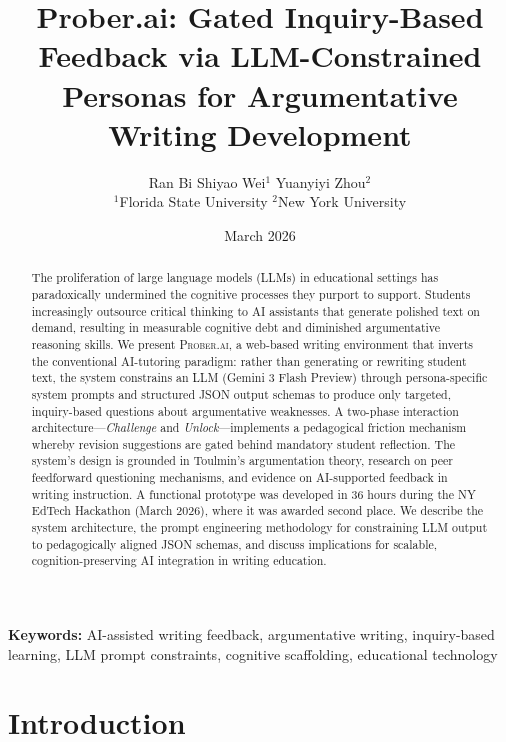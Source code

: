 \documentclass[11pt,a4paper]{article}
\title{%
\textbf{Prober.ai: Gated Inquiry-Based Feedback via LLM-Constrained Personas for Argumentative Writing Development}
}
\author{
Ran Bi \quad Shiyao Wei$^{1}$ \quad Yuanyiyi Zhou$^{2}$ \\[4pt]
\small $^{1}$Florida State University \quad $^{2}$New York University
}
\date{March 2026}
\begin{document}
\maketitle

\begin{abstract}
The proliferation of large language models (LLMs) in educational settings has paradoxically undermined the cognitive processes they purport to support. Students increasingly outsource critical thinking to AI assistants that generate polished text on demand, resulting in measurable cognitive debt and diminished argumentative reasoning skills. We present \textsc{Prober.ai}, a web-based writing environment that inverts the conventional AI-tutoring paradigm: rather than generating or rewriting student text, the system constrains an LLM (Gemini 3 Flash Preview) through persona-specific system prompts and structured JSON output schemas to produce only targeted, inquiry-based questions about argumentative weaknesses. A two-phase interaction architecture---\textit{Challenge} and \textit{Unlock}---implements a pedagogical friction mechanism whereby revision suggestions are gated behind mandatory student reflection. The system's design is grounded in Toulmin's argumentation theory, research on peer feedforward questioning mechanisms, and evidence on AI-supported feedback in writing instruction. A functional prototype was developed in 36 hours during the NY EdTech Hackathon (March 2026), where it was awarded second place. We describe the system architecture, the prompt engineering methodology for constraining LLM output to pedagogically aligned JSON schemas, and discuss implications for scalable, cognition-preserving AI integration in writing education.
\end{abstract}

\medskip
\noindent\textbf{Keywords:} AI-assisted writing feedback, argumentative writing, inquiry-based learning, LLM prompt constraints, cognitive scaffolding, educational technology

\section{Introduction}
\label{sec:introduction}
\end{document}

